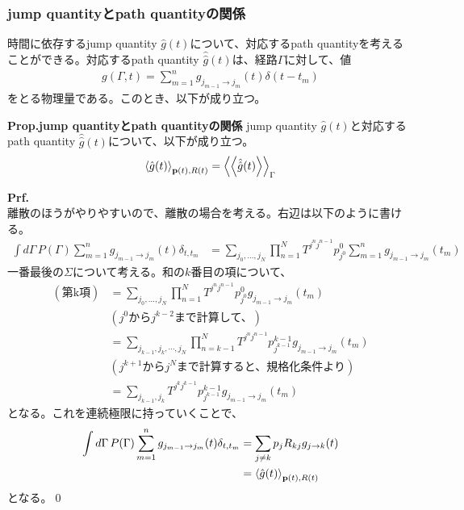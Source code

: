 \documentclass[a4paper,11pt]{jsarticle}
\numberwithin{equation}{section}
\begin{document}
\subsubsection{jump quantityとpath quantityの関係}
時間に依存するjump quantity $\hat{g}(t)$について、対応するpath quantityを考えることができる。対応するpath quantity $\hat{\hat{g}}(t)$は、経路$\Gamma$に対して、値
\begin{align}
    g(\Gamma,t) = \sum_{m=1}^{n} g_{j_{m-1} \to j_{m}}(t) \delta(t-t_{m})
\end{align}
をとる物理量である。このとき、以下が成り立つ。
\begin{itembox}[l]{\textbf{Prop.jump quantityとpath quantityの関係}}
    jump quantity $\hat{g}(t)$と対応するpath quantity $\hat{\hat{g}}(t)$について、以下が成り立つ。
    \begin{align}
        \ev{\hat{g}(t)}_{\vb{p}(t),R(t)} = \ev{\ev{\hat{\hat{g}}(t)}}_{\Gamma}
    \end{align}
\end{itembox}
\textbf{Prf.}\\
離散のほうがやりやすいので、離散の場合を考える。右辺は以下のように書ける。
\begin{align}
    \int d\Gamma \, P(\Gamma) \sum_{m=1}^{n} g_{j_{m-1} \to j_{m}}(t) \delta_{t,t_m}
    &= \sum_{j_0, \dots, j_N} \prod_{n=1}^N T^{j^n j^{n-1}} p^0_{j^0} 
    \sum_{m=1}^{n} g_{j_{m-1} \to j_{m}}(t_m) 
\end{align}
一番最後の$\Sigma$について考える。和の$k$番目の項について、
\begin{align}
    (\text{第k項}) &= \sum_{j_0, \dots, j_N} \prod_{n=1}^N T^{j^n j^{n-1}} p^0_{j^0} g_{j_{m-1} \to j_{m}}(t_m) \\
    &(j^{0}\text{から}j^{k-2}\text{まで計算して、}) \nonumber \\
    &= \sum_{j_{k-1}, j_k, \cdots, j_N} \prod_{n=k-1}^N T^{j^n j^{n-1}} p^{k-1}_{j^{k-1}} g_{j_{m-1} \to j_{m}}(t_m) \\
    &(j^{k+1}\text{から}j^{N}\text{まで計算すると、規格化条件より}) \nonumber \\
    &= \sum_{j_{k-1}, j_k} T^{j^k j^{k-1}} p^{k-1}_{j^{k-1}} g_{j_{m-1} \to j_{m}}(t_m)
\end{align}
となる。これを連続極限に持っていくことで、
\begin{align}
    \int d\Gamma \, P(\Gamma) \sum_{m=1}^{n} g_{j_{m-1} \to j_{m}}(t) \delta_{t,t_m}
    &= \sum_{j\neq k} p_{j} R_{kj} g_{j \to k}(t)\\
    &= \ev{\hat{g}(t)}_{\vb{p}(t), R(t)}
\end{align}
となる。\qed
\end{document}
